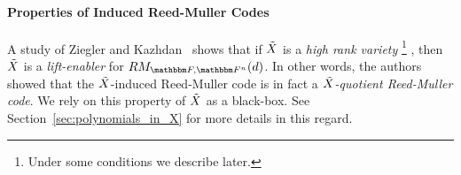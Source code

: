 \paragraph{Properties of Induced Reed-Muller Codes}
A study of Ziegler and Kazhdan~\cite{kazhdan2018polynomial, kazhdan2019extendingweaklypolynomialfunctions, kazhdan2020propertieshighranksubvarieties}
shows that if ${\tilde{X}}$ is a \emph{high rank variety}
\footnote{Under some conditions we describe later.}
, then ${\tilde{X}}$ is a \emph{lift-enabler} for $\reedmullercodeex{\basefield}{\field}{\degree}$.
In other words, the authors showed that the ${\tilde{X}}$-induced Reed-Muller code is in fact a \emph{${\tilde{X}}$-quotient Reed-Muller code}.
We rely on this property of ${\tilde{X}}$ as a black-box.
See Section~\ref{sec:polynomials_in_X} for more details in this regard.

